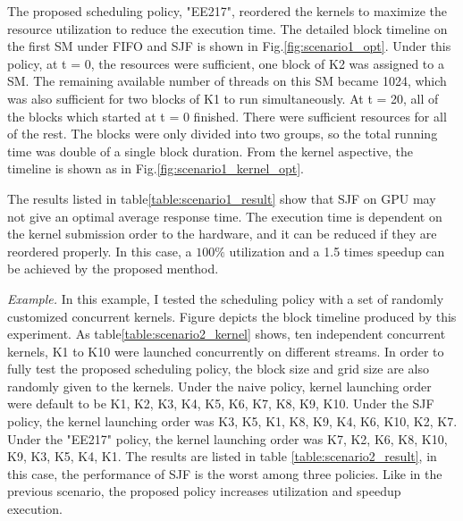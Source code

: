 \documentclass[conference]{IEEEtran}
\begin{document}
The proposed scheduling policy, "EE217", reordered the kernels to maximize the resource utilization to reduce the execution time. The detailed block timeline on the first SM under FIFO and SJF is shown in Fig.\ref{fig:scenario1_opt}. Under this policy, at t = 0, the resources were sufficient, one block of K2 was assigned to a SM. The remaining available number of threads on this SM became 1024, which was also sufficient for two blocks of K1 to run simultaneously. At t = 20, all of the blocks which started at t = 0 finished. There were sufficient resources for all of the rest. The blocks were only divided into two groups, so the total running time was double of a single block duration. From the kernel aspective, the timeline is shown as in Fig.\ref{fig:scenario1_kernel_opt}.\par

 The results listed in table\ref{table:scenario1_result} show that SJF on GPU may not give an optimal average response time. The execution time is dependent on the kernel submission order to the hardware, and it can be reduced if they are reordered properly. In this case, a $100\%$ utilization and a 1.5 times speedup can be achieved by the proposed menthod.\par




\textit{Example.}
In this example, I tested the scheduling policy with a set of randomly customized concurrent kernels. Figure depicts the block timeline produced by this experiment. As table\ref{table:scenario2_kernel} shows, ten independent concurrent kernels, K1 to K10 were launched concurrently on different streams. In order to fully test the proposed scheduling policy, the block size and grid size are also randomly given to the kernels. Under the naive policy, kernel launching order were default to be K1, K2, K3, K4, K5, K6, K7, K8, K9, K10. Under the SJF policy, the kernel launching order was K3, K5, K1, K8, K9, K4, K6, K10, K2, K7. Under the "EE217" policy, the kernel launching order was K7, K2, K6, K8, K10, K9, K3, K5, K4, K1. The results are listed in table \ref{table:scenario2_result}, in this case, the performance of SJF is the worst among three policies. Like in the previous scenario, the proposed policy increases utilization and speedup execution.\par
\end{document}
